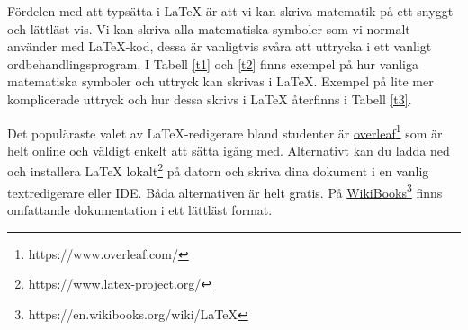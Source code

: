 \documentclass[titlepage]{article}
\begin{document}
Fördelen med att typsätta i \LaTeX$ $ är att vi kan skriva matematik på ett snyggt och lättläst vis. Vi kan skriva alla matematiska symboler som vi normalt använder med \LaTeX-kod, dessa är vanligtvis svåra att uttrycka i ett vanligt ordbehandlingsprogram. I Tabell \ref{t1} och \ref{t2} finns exempel på hur vanliga matematiska symboler och uttryck kan skrivas i \LaTeX. Exempel på lite mer komplicerade uttryck och hur dessa skrivs i \LaTeX$ $ återfinns i Tabell \ref{t3}.

Det populäraste valet av \LaTeX-redigerare bland studenter är \href{https://www.overleaf.com/}{overleaf}\footnote{https://www.overleaf.com/} som är helt online och väldigt enkelt att sätta igång med. Alternativt kan du ladda ned och installera \LaTeX $ $ lokalt\footnote{https://www.latex-project.org/} på datorn och skriva dina dokument i en vanlig textredigerare eller IDE. Båda alternativen är helt gratis. På \href{https://en.wikibooks.org/wiki/LaTeX}{WikiBooks}\footnote{https://en.wikibooks.org/wiki/LaTeX} finns omfattande dokumentation i ett lättläst format.
\end{document}
